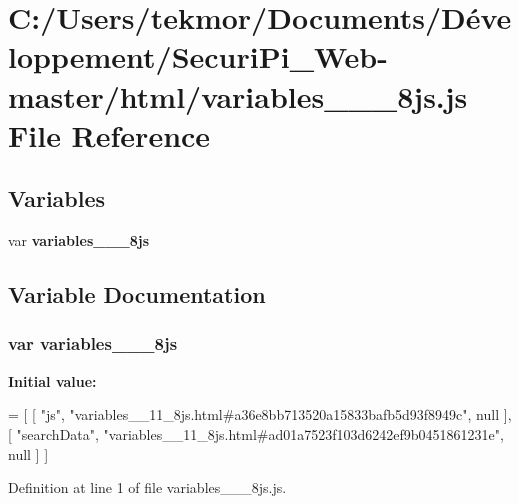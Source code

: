 \section{C\+:/\+Users/tekmor/\+Documents/\+Développement/\+Securi\+Pi\+\_\+\+Web-\/master/html/variables\+\_\+\+\_\+\_\+8js.js File Reference}
\label{variables____11__8js_8js}
\subsection*{Variables}
\begin{DoxyCompactItemize}
\item 
var {\bf variables\+\_\+\+\_\+\_\+8js}
\end{DoxyCompactItemize}


\subsection{Variable Documentation}
\subsubsection[{variables\+\_\+\+\_\+11\+\_\+8js}]{\setlength{\rightskip}{0pt plus 5cm}var variables\+\_\+\+\_\+\_\+8js}\label{variables____11__8js_8js_a8b4983c2c5d64d617f3c2f431cc4a384}
{\bfseries Initial value\+:}
\begin{DoxyCode}
=
[
    [ \textcolor{stringliteral}{"js"}, \textcolor{stringliteral}{"variables\_\_11\_8js.html#a36e8bb713520a15833bafb5d93f8949c"}, null ],
    [ \textcolor{stringliteral}{"searchData"}, \textcolor{stringliteral}{"variables\_\_11\_8js.html#ad01a7523f103d6242ef9b0451861231e"}, null ]
]
\end{DoxyCode}


Definition at line 1 of file variables\+\_\+\+\_\+\_\+8js.\+js.

